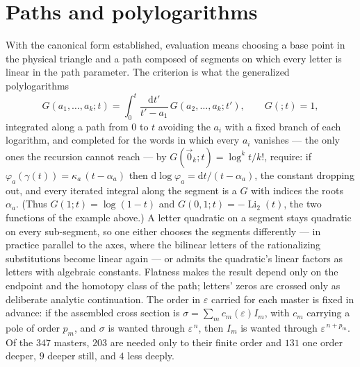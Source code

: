 \documentclass[11pt]{article}
\newcommand{\eps}{\varepsilon}
\newcommand{\dd}{\mathrm{d}}
\begin{document}
\section{Paths and polylogarithms}
With the canonical form established, evaluation means choosing a
base point in the physical triangle and a path composed of segments
on which every letter is linear in the path parameter.  The criterion
is what the generalized polylogarithms
\begin{equation}
  G(a_1,\dots,a_k;t) = \int_0^t \frac{\dd t'}{t'-a_1}\,
  G(a_2,\dots,a_k;t') , \qquad G(;t) = 1 ,
\end{equation}
integrated along a path from $0$ to $t$ avoiding the $a_i$ with a
fixed branch of each logarithm, and completed for the words in which
every $a_i$ vanishes --- the only ones the recursion cannot reach ---
by $G(\vec 0_k;t) = \log^k t/k!$, require: if
$\varphi_a(\gamma(t)) = \kappa_a\,(t-\alpha_a)$ then
$\dd\log\varphi_a = \dd t/(t-\alpha_a)$, the constant dropping out,
and every iterated integral along the segment is a $G$ with indices
the roots $\alpha_a$.  (Thus $G(1;t) = \log(1-t)$ and
$G(0,1;t) = -\operatorname{Li}_2(t)$, the two functions of the
example above.)  A letter quadratic on a segment stays quadratic on
every sub-segment, so one either chooses the segments differently ---
in practice parallel to the axes, where the bilinear letters of the
rationalizing substitutions become linear again --- or admits the
quadratic's linear factors as letters with algebraic constants.
Flatness makes the result depend only on the endpoint and the
homotopy class of the path; letters' zeros are crossed only as
deliberate analytic continuation.  The order in $\eps$ carried for
each master is fixed in advance: if the assembled cross section is
$\sigma = \sum_m c_m(\eps) I_m$, with $c_m$ carrying a pole of order
$p_m$, and $\sigma$ is wanted through $\eps^{\,n}$, then $I_m$ is
wanted through $\eps^{\,n+p_m}$.  Of the $347$ masters, $203$ are
needed only to their finite order and $131$ one order deeper, $9$
deeper still, and $4$ less deeply.
\end{document}
